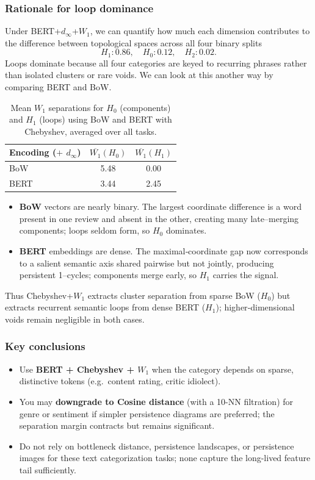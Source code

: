 \documentclass[fleqn,10pt]{SelfArx}
\begin{document}
\subsubsection*{Rationale for loop dominance}
Under BERT+$d_{\infty}$+$W_1$, we can quantify how much each dimension contributes to the difference between topological spaces across all four binary splits
$$
H_1{:} 0.86,\quad H_0{:} 0.12,\quad H_2{:} 0.02.
$$
Loops dominate because all four categories are keyed to recurring phrases rather than isolated clusters or rare voids. We can look at this another way by comparing BERT and BoW.
\begin{table}[H]
\centering
\begin{tabular}{lcc}
\toprule
Encoding ($+$ $d_{\infty}$) & $\overline{W_1}(H_0)$ & $\overline{W_1}(H_1)$\\
\midrule
BoW          & 5.48 & 0.00\\
BERT         & 3.44 & 2.45\\
\bottomrule
\end{tabular}
\caption{Mean $W_1$ separations for $H_0$ (components) and $H_1$ (loops) using BoW and BERT with Chebyshev, averaged over all tasks.}
\label{tab:H0-vs-H1}
\end{table}
\begin{itemize}[leftmargin=*]
\item \textbf{BoW} vectors are nearly binary.  
The largest coordinate difference is a word present in one review and absent in the other, creating many late–merging components; loops seldom form, so $H_0$ dominates.
\item \textbf{BERT} embeddings are dense.  
The maximal‐coordinate gap now corresponds to a salient semantic axis shared pairwise but not jointly, producing persistent 1–cycles; components merge early, so $H_1$ carries the signal.
\end{itemize}
Thus Chebyshev+$W_1$ extracts cluster separation from sparse BoW ($H_0$) but extracts recurrent semantic loops from dense BERT ($H_1$); higher‐dimensional voids remain negligible in both cases.
\subsubsection*{Key conclusions}
\begin{itemize}[leftmargin=*]
  \item Use \textbf{BERT + Chebyshev + $W_1$} when the category depends on sparse, distinctive tokens (e.g.\ content rating, critic idiolect).
  \item You may \textbf{downgrade to Cosine distance} (with a 10-NN filtration) for genre or sentiment if simpler persistence diagrams are preferred; the separation margin contracts but remains significant.
  \item Do not rely on bottleneck distance, persistence landscapes, or persistence images for these text categorization tasks; none capture the long-lived feature tail sufficiently.
\end{itemize}
\end{document}
